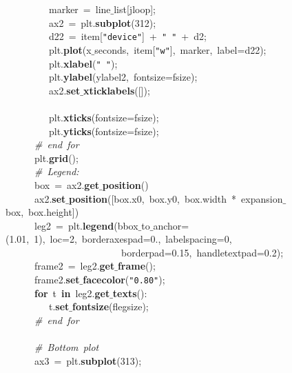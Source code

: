 \mbox{}\ \ \ \ \ \ \ \ \ marker\ =\ line$\_$list[jloop]; \\
\mbox{}\ \ \ \ \ \ \ \ \ ax2\ =\ plt.\textbf{subplot}(312); \\
\mbox{}\ \ \ \ \ \ \ \ \ d22\ =\ item[\texttt{"{}device"{}}]\ +\ \texttt{"{}\ "{}}\ +\ d2; \\
\mbox{}\ \ \ \ \ \ \ \ \ plt.\textbf{plot}(x$\_$seconds,\ item[\texttt{"{}w"{}}],\ marker,\ label=d22); \\
\mbox{}\ \ \ \ \ \ \ \ \ plt.\textbf{xlabel}(\texttt{"{}\ "{}}); \\
\mbox{}\ \ \ \ \ \ \ \ \ plt.\textbf{ylabel}(ylabel2,\ fontsize=fsize); \\
\mbox{}\ \ \ \ \ \ \ \ \ ax2.\textbf{set$\_$xticklabels}([]); \\
\mbox{}\ \ \ \ \ \ \ \ \  \\
\mbox{}\ \ \ \ \ \ \ \ \ plt.\textbf{xticks}(fontsize=fsize); \\
\mbox{}\ \ \ \ \ \ \ \ \ plt.\textbf{yticks}(fontsize=fsize); \\
\mbox{}\ \ \ \ \ \ \textit{\#\ end\ for} \\
\mbox{}\ \ \ \ \ \ plt.\textbf{grid}(); \\
\mbox{}\ \ \ \ \ \ \textit{\#\ Legend:} \\
\mbox{}\ \ \ \ \ \ box\ =\ ax2.\textbf{get$\_$position}() \\
\mbox{}\ \ \ \ \ \ ax2.\textbf{set$\_$position}([box.x0,\ box.y0,\ box.width\ *\ expansion$\_$box,\ box.height]) \\
\mbox{}\ \ \ \ \ \ leg2\ =\ plt.\textbf{legend}(bbox$\_$to$\_$anchor=(1.01,\ 1),\ loc=2,\ borderaxespad=0.,\ labelspacing=0,\  \\
\mbox{}\ \ \ \ \ \ \ \ \ \ \ \ \ \ \ \ \ \ \ \ \ \ \ \ borderpad=0.15,\ handletextpad=0.2); \\
\mbox{}\ \ \ \ \ \ frame2\ =\ leg2.\textbf{get$\_$frame}(); \\
\mbox{}\ \ \ \ \ \ frame2.\textbf{set$\_$facecolor}(\texttt{"{}0.80"{}}); \\
\mbox{}\ \ \ \ \ \ \textbf{for}\ t\ \textbf{in}\ leg2.\textbf{get$\_$texts}(): \\
\mbox{}\ \ \ \ \ \ \ \ \ t.\textbf{set$\_$fontsize}(flegsize); \\
\mbox{}\ \ \ \ \ \ \textit{\#\ end\ for} \\
\mbox{}\ \ \ \ \ \  \\
\mbox{}\ \ \ \ \ \ \textit{\#\ Bottom\ plot} \\
\mbox{}\ \ \ \ \ \ ax3\ =\ plt.\textbf{subplot}(313); \\
